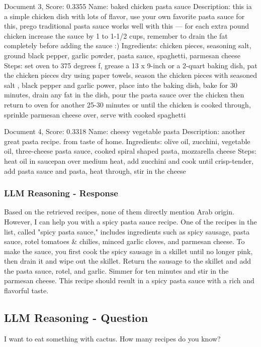 \documentclass[a4paper,11pt]{article}
\begin{document}
Document 3, Score: 0.3355
Name: baked chicken pasta sauce
Description: this ia a simple chicken dish with lots of flavor, use your own favorite pasta sauce for this, prego traditional pasta sauce works well with this --- for each extra pound chicken increase the sauce by 1 to 1-1/2 cups, remember to drain the fat completely before adding the sauce :)
Ingredients: chicken pieces, seasoning salt, ground black pepper, garlic powder, pasta sauce, spaghetti, parmesan cheese
Steps: set oven to 375 degrees f, grease a 13 x 9-inch or a 2-quart baking dish, pat the chicken pieces dry using paper towels, season the chicken pieces with seasoned salt , black pepper and garlic power, place into the baking dish, bake for 30 minutes, drain any fat in the dish, pour the pasta sauce over the chicken then return to oven for another 25-30 minutes or until the chicken is cooked through, sprinkle parmesan cheese over, serve with cooked spaghetti

Document 4, Score: 0.3318
Name: cheesy vegetable pasta
Description: another great pasta recipe.  from taste of home.
Ingredients: olive oil, zucchini, vegetable oil, three-cheese pasta sauce, cooked spiral shaped pasta, mozzarella cheese
Steps: heat oil in saucepan over medium heat, add zucchini and cook until crisp-tender, add pasta sauce and pasta, heat through, stir in the cheese


\subsubsection{LLM Reasoning - Response}
Based on the retrieved recipes, none of them directly mention Arab origin. However, I can help you with a spicy pasta sauce recipe.
One of the recipes in the list, called "spicy pasta sauce," includes ingredients such as spicy sausage, pasta sauce, rotel tomatoes \& chilies,
minced garlic cloves, and parmesan cheese. To make the sauce, you first cook the spicy sausage in a skillet until no longer pink, 
then drain it and wipe out the skillet. Return the sausage to the skillet and add the pasta sauce, rotel, and garlic. 
Simmer for ten minutes and stir in the parmesan cheese. This recipe should result in a spicy pasta sauce with a rich and flavorful taste.

\subsection{LLM Reasoning - Question}
I want to eat something with cactus. How many recipes do you know?
\end{document}
